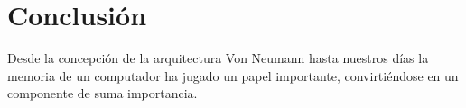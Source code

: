 \section{Conclusión} \label{conclulsion}
Desde la concepción de la arquitectura Von Neumann hasta nuestros días la memoria de un computador ha jugado un papel importante, convirtiéndose en un componente de suma importancia.  

\newpage


\cite{rebollo}
\cite{Beekman}
\cite{barcelo}
\cite{Mano}



